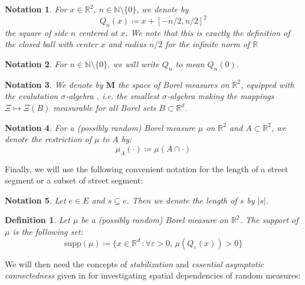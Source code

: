 \documentclass[10pt,a4paper]{amsart}
\theoremstyle{exampstyle}
\newtheorem{Definition}{Definition}
\theoremstyle{exampnotations}
\newtheorem{Notation}{Notation}
\begin{document}
\begin{Notation}
For $x \in \mathbb{R}^{2}$, $n \in \mathbb{N} \setminus \lbrace 0 \rbrace$, we denote by $$Q_n(x) \coloneqq x + \left[-n/2,n/2\right]^{2}$$ the square of side $n$ centered at $x$. We note that this is exactly the definition of the closed ball with center $x$ and radius $n/2$ for the infinite norm of $\mathbb{R}$
\end{Notation}

\begin{Notation}
For $n \in \mathbb{N} \setminus \lbrace 0 \rbrace$, we will write 
$Q_n$ to mean $Q_n(0)$.
\end{Notation}

\begin{Notation}
We denote by $\mathbf{M}$ the space of Borel measures on $\mathbb{R}^{2}$, equipped with the evalutation $\sigma$-algebra \cite[Section 13.1]{last2017lectures}, i.e. the smallest $\sigma$-algebra making the mappings $\Xi \mapsto \Xi(B)$ measurable for all Borel sets $B \subset \mathbb{R}^{d}$.
\end{Notation}

\begin{Notation}
For a (possibly random) Borel measure $\mu$ on $\mathbb{R}^{2}$ and $A \subset \mathbb{R}^{2}$, we denote the restriction of $\mu$ to $A$ by: $$\mu_A(\cdot) \coloneqq \mu(A \cap \cdot)$$
\end{Notation}

Finally, we will use the following convenient notation for the length of a street segment or a subset of street segment:
\begin{Notation}
Let $e \in E$ and $s \subseteq e$. Then we denote the length of $s$ by $\vert s \vert$.
\end{Notation}

\begin{Definition}
Let $\mu$ be a (possibly random) Borel measure on $\mathbb{R}^{2}$. The \emph{support} of $\mu$ is the following set:
$$\text{supp}(\mu) \coloneqq \lbrace x \in \mathbb{R}^{d} \, : \forall \varepsilon > 0, \,  \mu(Q_{\varepsilon}(x)) > 0 \rbrace$$
\end{Definition}
We will then need the concepts of \emph{stabilization} and \emph{essential asymptotic connectedness} given in \cite{hirsch_continuum_2017} for investigating spatial dependencies of random measures:
\end{document}
